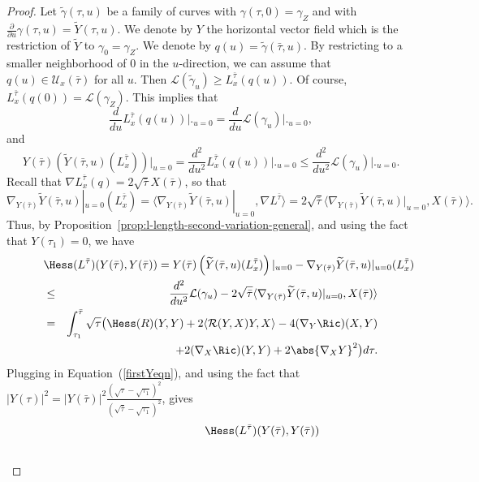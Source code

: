 \begin{proof}
\sketch
{}
Let $\tilde\gamma(\tau,u)$ be a family  of curves with
$\gamma(\tau,0)=\gamma_Z$ and with $\frac{\partial}{\partial
u}\gamma(\tau,u)=\widetilde Y(\tau,u)$. We denote by $Y$ the
horizontal vector field which is the restriction of $\widetilde Y$
to $\gamma_0=\gamma_Z$. We denote by
$q(u)=\tilde\gamma(\bar\tau,u)$. By restricting to a smaller
neighborhood of $0$ in the $u$-direction, we can assume that
$q(u)\in {\mathcal U}_x(\bar\tau)$ for all $u$. Then ${\mathcal
L}(\tilde\gamma_u)\ge L_x^{\bar\tau}(q(u))$. Of course,
$L_x^{\bar\tau}(q(0))={\mathcal L}(\gamma_Z)$. This implies that
$$\frac{d}{d u}L_x^{\bar\tau}(q(u))\bigl|\bigr._{u=0}=
\frac{d}{du}{\mathcal L}(\gamma_u)\bigl|\bigr._{u=0},$$
 and
$$
Y(\bar\tau)(\widetilde
Y(\bar\tau,u)(L^{\bar\tau}_x))|_{u=0}=\frac{d^2}{du^2}L_x^{\bar\tau}(q(u))\bigl|\bigr._{u=0}\le
\frac{d^2}{du^2}{\mathcal L}(\gamma_u)\bigl|\bigr._{u=0}.$$
 Recall that
$\nabla L_x^{\bar\tau}(q) = 2\sqrt{\bar\tau}X(\bar\tau)$, so that
$$\nabla_{Y(\bar\tau)}\widetilde Y(\bar\tau,u)|_{u=0}(L_x^{\bar\tau})=
\langle \nabla_{Y(\bar\tau)}\widetilde Y(\bar\tau,u)|_{u=0},\nabla
L^{\bar\tau}\rangle = 2\sqrt{\bar\tau}\langle
\nabla_{Y(\bar\tau)}\widetilde
Y(\bar\tau,u)|_{u=0},X(\bar\tau)\rangle .$$ Thus, by
Proposition~\ref{prop:l-length-second-variation-general}, and using the fact that
$Y(\tau_1)=0$, we have
\begin{eqnarray*}
\lefteqn{\Hess(L^{\bar\tau})(Y(\bar\tau),Y(\bar\tau))  =
Y(\bar\tau)\left(\widetilde
Y(\bar\tau,u)(L_x^{\bar\tau})\right)|_{u=0}-
\nabla_{Y(\bar\tau)}\widetilde Y(\bar\tau,u)|_{u=0}(L_x^{\bar\tau})} \\
& \le & \frac{d^2}{du^2}{\mathcal
L}(\gamma_u)-2\sqrt{\bar\tau}\langle
\nabla_{Y(\bar\tau)}\widetilde Y(\bar\tau,u)|_{u=0},X(\bar\tau)\rangle \\
 & = & \int_{\tau_1}^{\bar\tau}
\sqrt{\tau}\bigl(\Hess(R)(Y,Y) +
2\langle {\mathcal R}(Y,X)Y,X\rangle - 4(\nabla_{Y}\Ric)(X,Y)\bigr. \\
& & \ \ \ \ \bigl.+ 2(\nabla_{X}\Ric)(Y,Y) +
2\abs{\nabla_XY}^2\bigr)d\tau.
\end{eqnarray*}
 Plugging in Equation~(\ref{firstYeqn}), and using the fact that
 $|Y(\tau)|^2=
|Y(\bar\tau)|^2\frac{(\sqrt{\tau}-\sqrt{\tau_1})^2}{(\sqrt{\bar\tau}-\sqrt{\tau_1})^2}$,
gives
\begin{eqnarray*}
\lefteqn{\Hess(L^{\bar\tau})(Y(\bar\tau),Y(\bar\tau)) } \\ &

\end{eqnarray*}
\end{proof}
